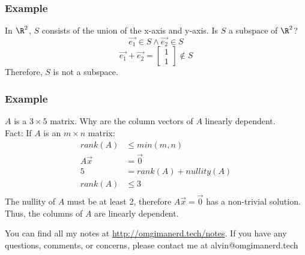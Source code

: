 \documentclass{math}
\begin{document}
\subsubsection*{Example}
In \( \R^2 \), \( S \) consists of the union of the x-axis and y-axis. Is
\( S \) a subspace of \( \R^2 \)?
\[ \vec{e_1}\in S \wedge \vec{e_2}\in S \]
\[ \vec{e_1}+\vec{e_2} = \begin{bmatrix}1 \\ 1\end{bmatrix}\notin S \]
Therefore, \( S \) is not a subspace.

\subsubsection*{Example}
\( A \) is a \( 3\times 5 \) matrix. Why are the column vectors of \( A \)
linearly dependent. \\
Fact: If \( A \) is an \( m\times n \) matrix:
\begin{align*}
  rank(A) &\le min(m,n) \\
  A\vec{x} &= \vec{0} \\
  5 &= rank(A)+nullity(A) \\
  rank(A) &\le 3 \\
\end{align*}
The nullity of \( A \) must be at least 2, therefore \( A\vec{x} = \vec{0} \)
has a non-trivial solution. Thus, the columns of \( A \) are linearly
dependent.

\begin{center}
  You can find all my notes at \url{http://omgimanerd.tech/notes}. If you have
  any questions, comments, or concerns, please contact me at
  alvin@omgimanerd.tech
\end{center}
\end{document}
